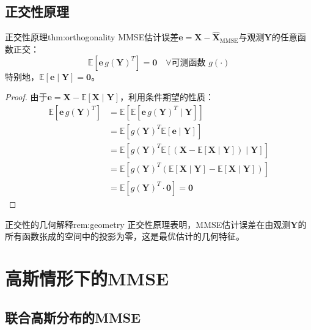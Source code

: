 \documentclass[11pt]{article}
\renewcommand{\vec}[1]{\bm{#1}}
\newcommand{\E}{\mathbb{E}}
\begin{document}
\subsection{正交性原理}

\begin{theorem}{正交性原理}{thm:orthogonality}
MMSE估计误差$\vec{e} = \vec{X} - \hat{\vec{X}}_{\text{MMSE}}$与观测$\vec{Y}$的任意函数正交：
\begin{equation}
\E[\vec{e} \, g(\vec{Y})^T] = \mathbf{0} \quad \forall \text{可测函数 } g(\cdot)
\end{equation}
特别地，$\E[\vec{e} \mid \vec{Y}] = \vec{0}$。
\end{theorem}

\begin{proof}
由于$\vec{e} = \vec{X} - \E[\vec{X} \mid \vec{Y}]$，利用条件期望的性质：
\begin{align}
\E[\vec{e} \, g(\vec{Y})^T] &= \E\left[ \E[\vec{e} \, g(\vec{Y})^T \mid \vec{Y}] \right] \\
&= \E\left[ g(\vec{Y})^T \E[\vec{e} \mid \vec{Y}] \right] \\
&= \E\left[ g(\vec{Y})^T \E[(\vec{X} - \E[\vec{X} \mid \vec{Y}]) \mid \vec{Y}] \right] \\
&= \E\left[ g(\vec{Y})^T (\E[\vec{X} \mid \vec{Y}] - \E[\vec{X} \mid \vec{Y}]) \right] \\
&= \E\left[ g(\vec{Y})^T \cdot \vec{0} \right] = \mathbf{0}
\end{align}
\end{proof}

\begin{remark}{正交性的几何解释}{rem:geometry}
正交性原理表明，MMSE估计误差在由观测$\vec{Y}$的所有函数张成的空间中的投影为零，这是最优估计的几何特征。
\end{remark}

\section{高斯情形下的MMSE}

\subsection{联合高斯分布的MMSE}
\end{document}
